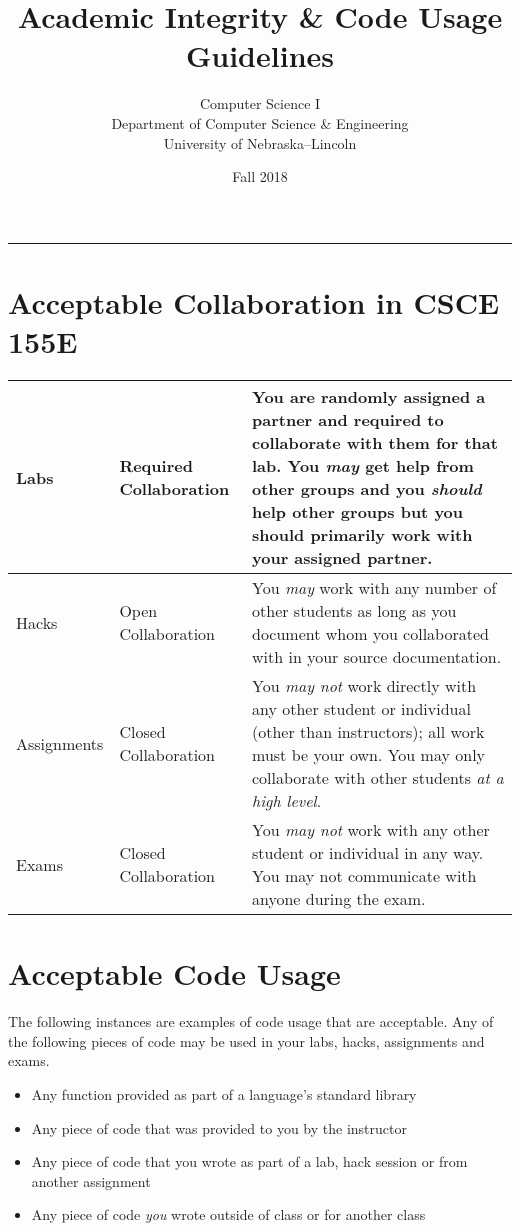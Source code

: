 \documentclass[12pt]{scrartcl}
\title{Academic Integrity \& Code Usage Guidelines}\let\Title\@title
\subtitle{Computer Science I\\
{\small
\vskip1cm
Department of Computer Science \& Engineering \\
University of Nebraska--Lincoln}
\vskip-1cm}
\date{Fall 2018}
\begin{document}
\maketitle

\hrule

\section*{Acceptable Collaboration in CSCE 155E}

\begin{center}
\begin{tabular}{|l|l|p{8cm}|}
\hline
Labs & Required Collaboration & You are randomly assigned a partner and required to collaborate with them for that lab.  You \emph{may} get help from other groups and
you \emph{should} help other groups but you should primarily work with your assigned partner. \\
\hline
Hacks & Open Collaboration & You \emph{may} work with any number of other students as long as you document whom you collaborated with in your source documentation.\\
\hline
Assignments & Closed Collaboration & You \emph{may not} work directly with any other student or individual (other than instructors); all work must be your own.  You may only collaborate with other students \emph{at a high level}.  \\
\hline
Exams & Closed Collaboration & You \emph{may not} work with any other student or individual in any way.  You may not communicate with anyone during the exam.\\
\hline
\end{tabular}
\end{center}

\section*{Acceptable Code Usage}

The following instances are examples of code usage that are acceptable.
Any of the following pieces of code may be used in your labs, hacks, assignments
and exams.

\begin{itemize}
  \item Any function provided as part of a language's standard library
  \item Any piece of code that was provided to you by the instructor
  \item Any piece of code that you wrote as part of a lab, hack session or from another assignment
  \item Any piece of code \emph{you} wrote outside of class or for another class
\end{itemize}
\end{document}
